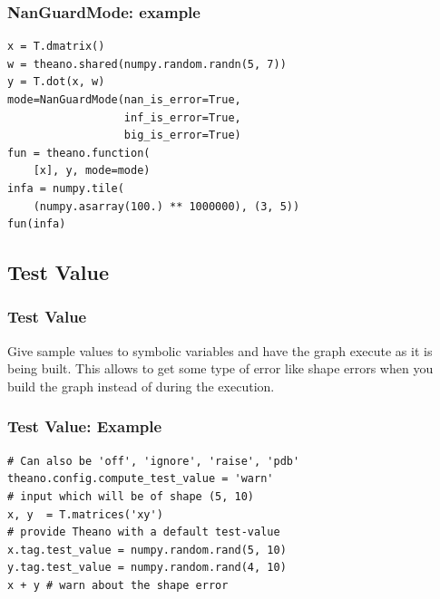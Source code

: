 \documentclass[utf8x,xcolor=pdftex,dvipsnames,table]{beamer}
\begin{document}
\begin{frame}[fragile]
  \frametitle{NanGuardMode: example}
\begin{lstlisting}
x = T.dmatrix()
w = theano.shared(numpy.random.randn(5, 7))
y = T.dot(x, w)
mode=NanGuardMode(nan_is_error=True,
                  inf_is_error=True,
                  big_is_error=True)
fun = theano.function(
    [x], y, mode=mode)
infa = numpy.tile(
    (numpy.asarray(100.) ** 1000000), (3, 5))
fun(infa)
\end{lstlisting}
\end{frame}

\subsection{Test Value}
\begin{frame}[fragile]
  \frametitle{Test Value}

Give sample values to symbolic variables and have the graph execute
as it is being built. This allows to get some type of error like shape
errors when you build the graph instead of during the execution.
 \vspace{1cm}
\end{frame}

\begin{frame}[fragile]
  \frametitle{Test Value: Example}
\begin{lstlisting}
# Can also be 'off', 'ignore', 'raise', 'pdb'
theano.config.compute_test_value = 'warn'
# input which will be of shape (5, 10)
x, y  = T.matrices('xy')
# provide Theano with a default test-value
x.tag.test_value = numpy.random.rand(5, 10)
y.tag.test_value = numpy.random.rand(4, 10)
x + y # warn about the shape error
\end{lstlisting}

\end{frame}
\end{document}
